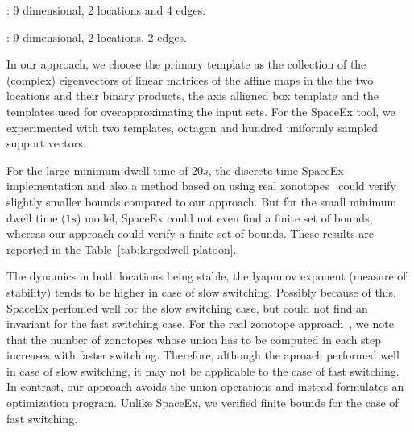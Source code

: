 : 9 dimensional, 2
locations and 4 edges.

: 9 dimensional, 2
locations, 2 edges.

  In our approach, we choose the primary template
as the collection of the (complex) eigenvectors of linear matrices of
the affine maps in the the two locations and their binary products,
the axis alligned box template and the templates used for
overapproximating the input sets. For the SpaceEx tool, we
experimented with two templates, octagon and hundred uniformly sampled
support vectors.

  For the large minimum dwell time of $20s$, the
discrete time SpaceEx implementation and also a method based on using
real zonotopes~\cite{makhlouf2014networked} could verify slightly
smaller bounds compared to our approach.
But for the small minimum dwell time ($1s$) model, SpaceEx could not
even find a finite set of bounds, whereas our approach could verify a
finite set of bounds.  These results are reported in the
Table~\ref{tab:largedwell-platoon}.

  The dynamics in both locations being stable, the
lyapunov exponent (measure of stability) tends to be higher in case of
slow switching.  Possibly because of this, SpaceEx perfomed well for
the slow switching case, but could not find an invariant for the fast
switching case.  For the real zonotope
approach~\cite{makhlouf2014networked}, we note that the number of
zonotopes whose union has to be computed in each step increases  with
faster switching.  Therefore, although the aproach performed well in
case of slow switching, it may not be applicable to the case of fast
switching.  In contrast, our approach
avoids the union operations and instead formulates an optimization
program.  Unlike SpaceEx, we verified finite bounds for the case of
fast switching.




